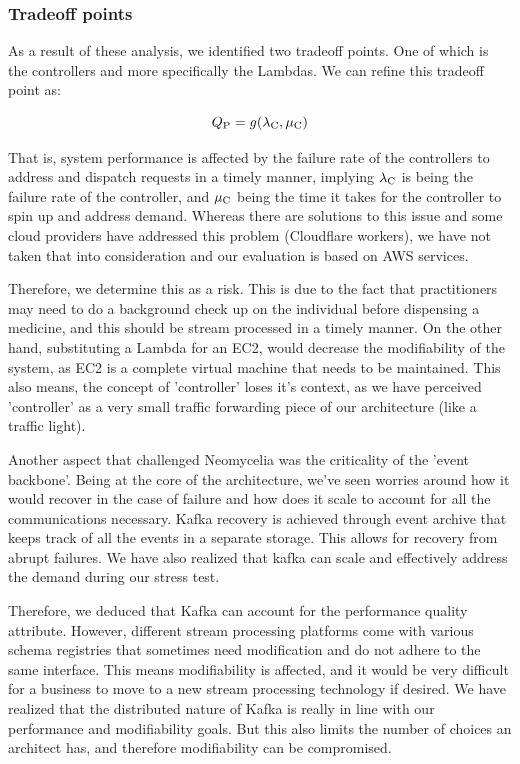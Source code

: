 \documentclass[10pt, conference]{IEEEtran}
\begin{document}
\subsubsection{Tradeoff points}

As a result of these analysis, we identified two tradeoff points. One of which is the controllers and more specifically the Lambdas. We can refine this tradeoff point as:

\begin{equation}
    Q\textsubscript{P} = g(\lambda \textsubscript{C},
    \mu \textsubscript{C})
\end{equation}

That is, system performance is affected by the failure rate of the controllers to address and dispatch requests in a timely manner, implying $ \lambda \textsubscript{C} $ is being the failure rate of the controller, and  $ \mu \textsubscript{C} $ being the time it takes for the controller to spin up and address demand. Whereas there are solutions to this issue and some cloud providers have addressed this problem (Cloudflare workers), we have not taken that into consideration and our evaluation is based on AWS services.

Therefore, we determine this as a risk. This is due to the fact that practitioners may need to do a background check up on the individual before dispensing a medicine, and this should be stream processed in a timely manner. On the other hand, substituting a Lambda for an EC2, would decrease the modifiability of the system, as EC2 is a complete virtual machine that needs to be maintained. This also means, the concept of 'controller' loses it's context, as we have perceived 'controller' as a very small traffic forwarding piece of our architecture (like a traffic light).

Another aspect that challenged Neomycelia was the criticality of the 'event backbone'. Being at the core of the architecture, we've seen worries around how it would recover in the case of failure and how does it scale to account for all the communications necessary. Kafka recovery is achieved through event archive that keeps track of all the events in a separate storage. This allows for recovery from abrupt failures. We have also realized that kafka can scale and effectively address the demand during our stress test.

Therefore, we deduced that Kafka can account for the performance quality attribute. However, different stream processing platforms come with various schema registries that sometimes need modification and do not adhere to the same interface. This means modifiability is affected, and it would be very difficult for a business to move to a new stream processing technology if desired. We have realized that the distributed nature of Kafka is really in line with our performance and modifiability goals. But this also limits the number of choices an architect has, and therefore modifiability can be compromised.
\end{document}
